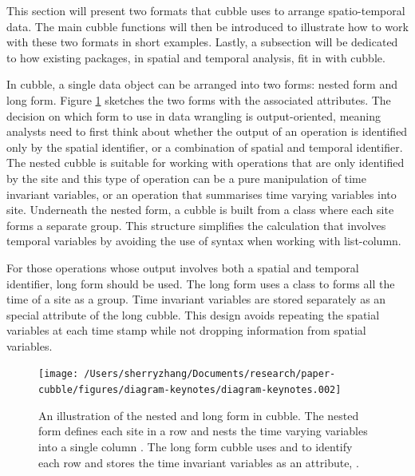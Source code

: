 \documentclass[
]{jss}
\begin{document}
This section will present two formats that cubble uses to arrange
spatio-temporal data. The main cubble functions will then be introduced
to illustrate how to work with these two formats in short examples.
Lastly, a subsection will be dedicated to how existing packages, in
spatial and temporal analysis, fit in with cubble.

In cubble, a single data object can be arranged into two forms: nested
form and long form. Figure \ref{fig:illu-cubble} sketches the two forms
with the associated attributes. The decision on which form to use in
data wrangling is output-oriented, meaning analysts need to first think
about whether the output of an operation is identified only by the
spatial identifier, or a combination of spatial and temporal identifier.
The nested cubble is suitable for working with operations that are only
identified by the site and this type of operation can be a pure
manipulation of time invariant variables, or an operation that
summarises time varying variables into site. Underneath the nested form,
a cubble is built from a  class where each site forms a
separate group. This structure simplifies the calculation that involves
temporal variables by avoiding the use of  syntax
when working with list-column.

For those operations whose output involves both a spatial and temporal
identifier, long form should be used. The long form uses a
 class to forms all the time of a site as a group. Time
invariant variables are stored separately as an special attribute of the
long cubble. This design avoids repeating the spatial variables at each
time stamp while not dropping information from spatial variables.

\begin{CodeChunk}
\begin{figure}

{\centering \texttt{[image: /Users/sherryzhang/Documents/research/paper-cubble/figures/diagram-keynotes/diagram-keynotes.002]} 

}

\caption{An illustration of the nested and long form in cubble. The nested form defines each site in a row and nests the time varying variables into a single column . The long form cubble uses  and  to identify each row and stores the time invariant variables as an attribute, .}\label{fig:illu-cubble}
\end{figure}
\end{CodeChunk}
\end{document}
